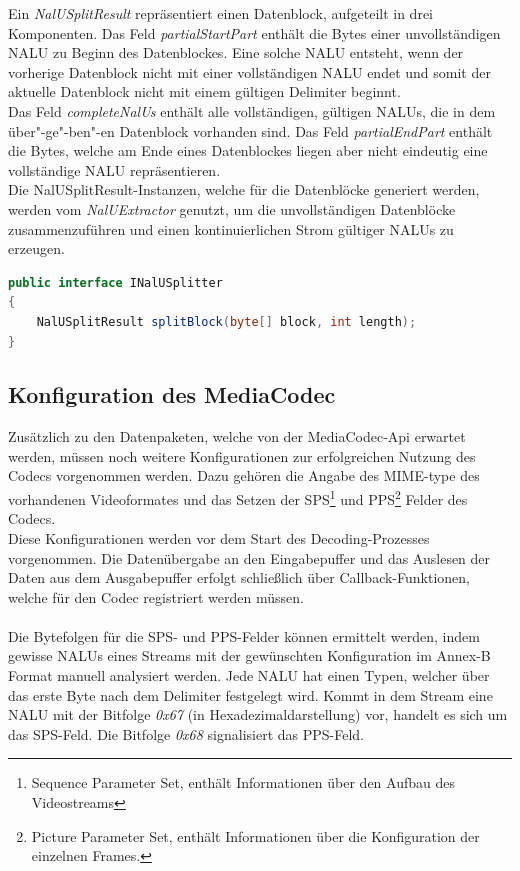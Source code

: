 Ein \textit{NalUSplitResult} repräsentiert einen Datenblock, aufgeteilt in drei Komponenten. Das Feld \textit{partialStartPart} enthält die Bytes einer unvollständigen NALU zu Beginn des Datenblockes. Eine solche NALU entsteht, wenn der vorherige Datenblock nicht mit einer vollständigen NALU endet und somit der aktuelle Datenblock nicht mit einem gültigen Delimiter beginnt.\\
Das Feld \textit{completeNalUs} enthält alle vollständigen, gültigen NALUs, die in dem über"-ge"-ben"-en Datenblock vorhanden sind. Das Feld \textit{partialEndPart} enthält die Bytes, welche am Ende eines Datenblockes liegen aber nicht eindeutig eine vollständige NALU repräsentieren.\\
Die NalUSplitResult-Instanzen, welche für die Datenblöcke generiert werden, werden vom \textit{NalUExtractor} genutzt, um die unvollständigen Datenblöcke zusammenzuführen und einen kontinuierlichen Strom gültiger NALUs zu erzeugen.\\
\begin{lstlisting}[caption=Definition des INaluUSplitter-Interface, label=lst:i_nalu_splitter, language=Java]
public interface INalUSplitter 
{
    NalUSplitResult splitBlock(byte[] block, int length);
}
\end{lstlisting}

\subsection{Konfiguration des MediaCodec}
Zusätzlich zu den Datenpaketen, welche von der MediaCodec-Api erwartet werden, müssen noch weitere Konfigurationen zur erfolgreichen Nutzung des Codecs vorgenommen werden. Dazu gehören die Angabe des MIME-type des vorhandenen Videoformates und das Setzen der SPS\footnote{Sequence Parameter Set, enthält Informationen über den Aufbau des Videostreams} und PPS\footnote{Picture Parameter Set, enthält Informationen über die Konfiguration der einzelnen Frames.} Felder des Codecs.\\
Diese Konfigurationen werden vor dem Start des Decoding-Prozesses vorgenommen. Die Datenübergabe an den Eingabepuffer und das Auslesen der Daten aus dem Ausgabepuffer erfolgt schließlich über Callback-Funktionen, welche für den Codec registriert werden müssen. \\
\\
Die Bytefolgen für die SPS- und PPS-Felder können ermittelt werden, indem gewisse NALUs eines Streams mit der gewünschten Konfiguration im Annex-B Format manuell analysiert werden. Jede NALU hat einen Typen, welcher über das erste Byte nach dem Delimiter festgelegt wird. Kommt in dem Stream eine NALU mit der Bitfolge \textit{0x67} (in Hexadezimaldarstellung) vor, handelt es sich um das SPS-Feld. Die Bitfolge \textit{0x68} signalisiert das PPS-Feld. 

